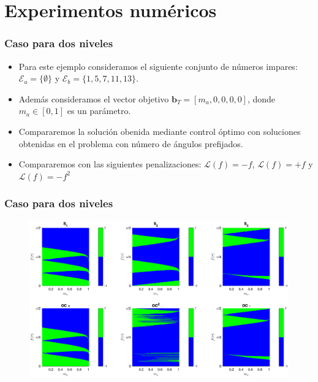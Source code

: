 \section{Experimentos numéricos}
\begin{frame}
    \frametitle{Caso para dos niveles}
    \begin{itemize}
        \item Para este ejemplo consideramos el siguiente conjunto de números impares: $\mathcal{E}_a = \{\emptyset\}$ y $\mathcal{E}_b = \{1,5,7,11,13\}$.
        \item Además consideramos el vector objetivo $\bm{b}_T = [m_a,0,0,0,0]$, donde  $m_a \in [0,1]$ es un parámetro.
        \item Compararemos la solución obenida mediante control óptimo con soluciones obtenidas en el problema con número de ángulos prefijados.
        \item Compararemos con las siguientes  penalizaciones: $\mathcal{L}(f) = -f$, $\mathcal{L}(f) = +f$ y $\mathcal{L}(f) = -f^2$
    \end{itemize}
\end{frame}

\begin{frame}
    \frametitle{Caso para dos niveles}
    \begin{figure}
        \centering
        \includegraphics[scale=0.35]{../D0002-FullReport/img/EX01_surf.eps}
    \end{figure}
    
\end{frame}

